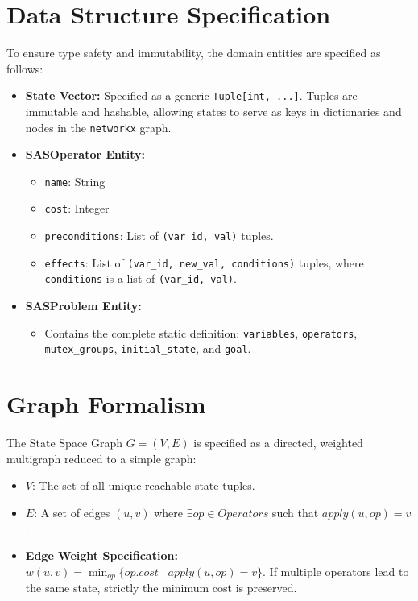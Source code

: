 \documentclass[12pt,a4paper]{report}
\begin{document}
\section{Data Structure Specification}
To ensure type safety and immutability, the domain entities are specified as follows:

\begin{itemize}
    \item \textbf{State Vector:} Specified as a generic \texttt{Tuple[int, ...]}. Tuples are immutable and hashable, allowing states to serve as keys in dictionaries and nodes in the \texttt{networkx} graph.
    \item \textbf{SASOperator Entity:}
    \begin{itemize}
        \item \texttt{name}: String
        \item \texttt{cost}: Integer
        \item \texttt{preconditions}: List of \texttt{(var\_id, val)} tuples.
        \item \texttt{effects}: List of \texttt{(var\_id, new\_val, conditions)} tuples, where \texttt{conditions} is a list of \texttt{(var\_id, val)}.
    \end{itemize}
    \item \textbf{SASProblem Entity:}
    \begin{itemize}
        \item Contains the complete static definition: \texttt{variables}, \texttt{operators}, \texttt{mutex\_groups}, \texttt{initial\_state}, and \texttt{goal}.
    \end{itemize}
\end{itemize}

\section{Graph Formalism}
The State Space Graph $G = (V, E)$ is specified as a directed, weighted multigraph reduced to a simple graph:
\begin{itemize}
    \item $V$: The set of all unique reachable state tuples.
    \item $E$: A set of edges $(u, v)$ where $\exists op \in Operators$ such that $apply(u, op) = v$.
    \item \textbf{Edge Weight Specification:} $w(u, v) = \min_{op} \{ op.cost \mid apply(u, op) = v \}$. If multiple operators lead to the same state, strictly the minimum cost is preserved.
\end{itemize}
\end{document}

